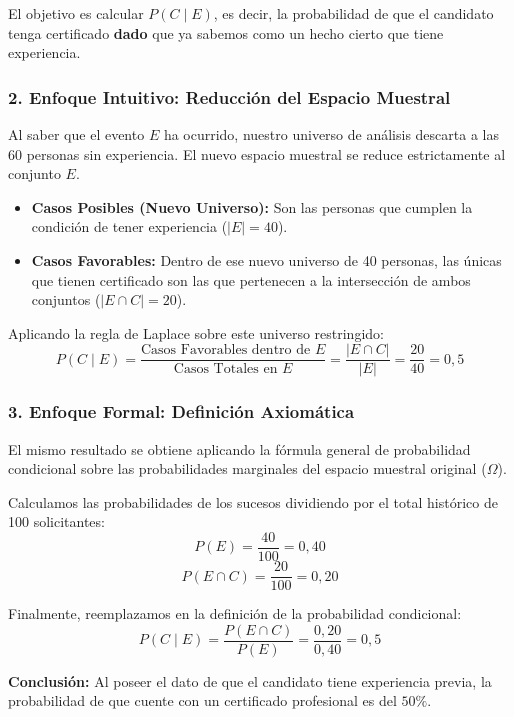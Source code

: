 \documentclass[11pt,a4paper]{article}
\begin{document}
El objetivo es calcular $P(C \mid E)$, es decir, la probabilidad de que el candidato tenga certificado \textbf{dado} que ya sabemos como un hecho cierto que tiene experiencia.

\subsubsection*{2. Enfoque Intuitivo: Reducción del Espacio Muestral}
Al saber que el evento $E$ ha ocurrido, nuestro universo de análisis descarta a las 60 personas sin experiencia. El nuevo espacio muestral se reduce estrictamente al conjunto $E$.

\begin{itemize}
    \item \textbf{Casos Posibles (Nuevo Universo):} Son las personas que cumplen la condición de tener experiencia ($|E| = 40$).
    \item \textbf{Casos Favorables:} Dentro de ese nuevo universo de 40 personas, las únicas que tienen certificado son las que pertenecen a la intersección de ambos conjuntos ($|E \cap C| = 20$).
\end{itemize}

Aplicando la regla de Laplace sobre este universo restringido:
$$ P(C \mid E) = \frac{\text{Casos Favorables dentro de } E}{\text{Casos Totales en } E} = \frac{|E \cap C|}{|E|} = \frac{20}{40} = 0,5 $$

\subsubsection*{3. Enfoque Formal: Definición Axiomática}
El mismo resultado se obtiene aplicando la fórmula general de probabilidad condicional sobre las probabilidades marginales del espacio muestral original ($\Omega$).

Calculamos las probabilidades de los sucesos dividiendo por el total histórico de 100 solicitantes:
$$ P(E) = \frac{40}{100} = 0,40 $$
$$ P(E \cap C) = \frac{20}{100} = 0,20 $$

Finalmente, reemplazamos en la definición de la probabilidad condicional:
$$ P(C \mid E) = \frac{P(E \cap C)}{P(E)} = \frac{0,20}{0,40} = 0,5 $$

\vspace{0.3cm}
\noindent \textbf{Conclusión:} Al poseer el dato de que el candidato tiene experiencia previa, la probabilidad de que cuente con un certificado profesional es del $50\%$.
\end{document}
